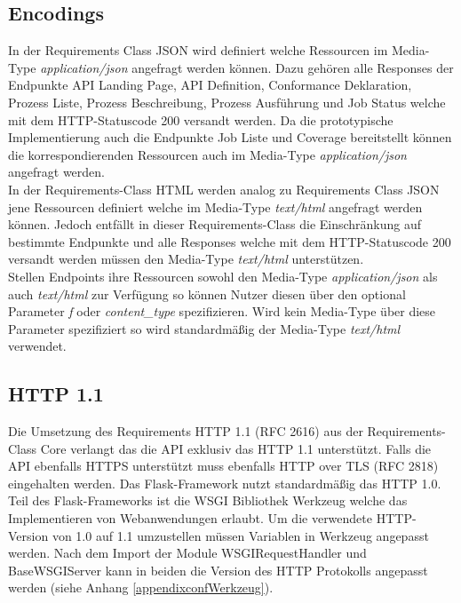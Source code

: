 \subsection{Encodings}
In der Requirements Class JSON wird definiert welche Ressourcen im Media-Type \textit{application/json} angefragt werden können. Dazu gehören alle Responses der 
Endpunkte API Landing Page, API Definition, Conformance Deklaration, Prozess Liste, Prozess Beschreibung, Prozess Ausführung und Job Status welche mit dem 
HTTP-Statuscode 200 versandt werden. Da die prototypische Implementierung auch die Endpunkte Job Liste und Coverage bereitstellt können die korrespondierenden
Ressourcen auch im Media-Type \textit{application/json} angefragt werden.\\

In der Requirements-Class HTML werden analog zu Requirements Class JSON jene Ressourcen definiert welche im Media-Type \textit{text/html} angefragt werden können. Jedoch
entfällt in dieser Requirements-Class die Einschränkung auf bestimmte Endpunkte und alle Responses welche mit dem HTTP-Statuscode 200 versandt werden müssen den 
Media-Type \textit{text/html} unterstützen.\\
Stellen Endpoints ihre Ressourcen sowohl den Media-Type \textit{application/json} als auch \textit{text/html} zur Verfügung so können Nutzer diesen über den optional Parameter
\textit{f} oder \textit{content\_type} spezifizieren. Wird kein Media-Type über diese Parameter spezifiziert so wird standardmäßig der Media-Type \textit{text/html} verwendet. \\

\subsection{HTTP 1.1}
Die Umsetzung des Requirements HTTP 1.1 (RFC 2616) aus der Requirements-Class Core verlangt das die API exklusiv das HTTP 1.1 unterstützt. 
Falls die API ebenfalls HTTPS unterstützt muss ebenfalls HTTP over TLS (RFC 2818) eingehalten werden. 
Das Flask-Framework nutzt standardmäßig das HTTP 1.0. Teil des Flask-Frameworks ist die WSGI Bibliothek Werkzeug welche
das Implementieren von Webanwendungen erlaubt. Um die verwendete HTTP-Version von 1.0 auf 1.1 umzustellen müssen Variablen 
in Werkzeug angepasst werden. Nach dem Import der Module WSGIRequestHandler und BaseWSGIServer kann in beiden die 
Version des HTTP Protokolls angepasst werden (siehe Anhang \ref{appendixconfWerkzeug}). 

